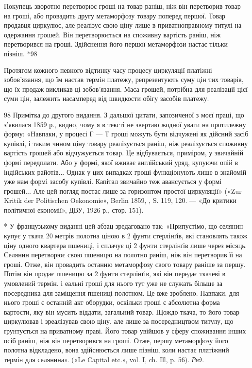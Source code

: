 Покупець зворотно перетворює гроші на товар раніш, ніж він перетворив товар на гроші, або провадить
другу метаморфозу товару поперед першої. Товар продавця циркулює, але реалізує свою ціну лише в
приватноправному титулі на одержання
грошей. Він перетворюється на споживну вартість раніш, ніж перетворився на гроші. Здійснення його
першої метаморфози настає тільки пізніш. *98

Протягом кожного певного відтинку часу процесу циркуляції платіжні зобов’язання, що їм настав термін
платежу, репрезентують суму цін тих товарів, що їх продаж викликав ці зобов’язання. Маса грошей,
потрібна для реалізації цієї суми цін,
залежить насамперед від швидкости обігу засобів платежу.

98 Примітка до другого видання. З дальшої цитати, запозиченої з моєї праці, що з’явилася 1859 р.,
видно, чому я в тексті не звертаю жодної уваги на протилежну форму: «Навпаки, у процесі Г — Т гроші
можуть бути відчужені як дійсний засіб купівлі, і таким чином ціну товару реалізується раніш, ніж
реалізується споживну вартість грошей або відчужується товар. Це відбувається, приміром, у звичайній
формі передплати. Або у формі, якої вживає англійський уряд, купуючи опій в індійських райотів...
Однак у цих випадках гроші функціонують лише в знайомій
уже нам формі засобу купівлі. Капітал звичайно теж авансується у формі грошей... Але цей погляд
постає лише за горизонтом простої циркуляції» («Zur Kritik der Politischen Oekonomie», Berlin 1859,
, S. 119, 120. — «До критики політичної економії», ДВУ, 1926 р., стор. 151).

*  У французькому виданні цей абзац зредаговано так: «Припустімо, що селянин купує у ткача 20 метрів
полотна ціною в 2 фунти стерлінґів, які становлять також ціну одного квартера пшениці, і сплачує ці
2 фунти стерлінґів лише через місяць. Селянин перетворює свою пшеницю на полотно раніш, ніж він
перетворив її на гроші. Отже, він провадить останню метаморфозу свого товару раніше за першу. Потім
він продає
пшеницю за 2 фунти стерлінґів, які він передає ткачеві в умовлений термін. і еальні гроші для нього
тут уже не служать більше за посередника для заміщення пшениці полотном. Це вже зроблено. Навпаки,
для нього гроші є останній акт оборудки, оскільки гроші є абсолютна форма вартости, яку він мусить
віддати, загальний товар. ІЦождо ткача, то його товар циркулював і зреалізував свою ціну, але лише
за посередництвом титулу, що ґрунтується на приватному праві. Його товар увійшов у сферу споживання
інших осіб раніш, ніж він перетворився на гроші. Отже, першу метаморфозу його полотна відкладено,
вона здійснюється лише пізніш, коли настає платіжний термін для селянина». («Le Capital etc.», vol.
I, ch. Ill, p. 56). \emph{Ред.}
\parbreak{}  %
